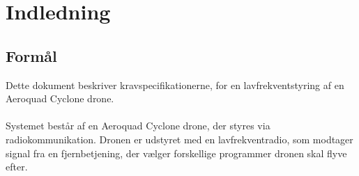 \documentclass[Main]{subfiles}
\begin{document}
\chapter{Indledning}

\section{Formål}

Dette dokument beskriver kravspecifikationerne, for en lavfrekventstyring af en Aeroquad Cyclone drone.
\\
\\
Systemet består af en Aeroquad Cyclone drone, der styres via radiokommunikation.
Dronen er udstyret med en lavfrekventradio, som modtager signal fra en fjernbetjening, der vælger forskellige programmer dronen skal flyve efter.


\end{document}
